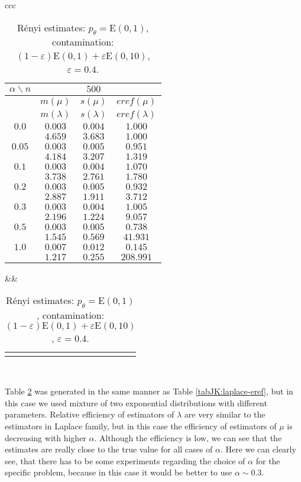 {\begin{table}[htb] \footnotesize
\begin{center}
\begin{tabular}{ccc}
	\begin{tabular}{|c|ccc|}
	\hline
	$\alpha\backslash n$ && $500$ & \\
	\hline
	& $m(\mu)$ & $s(\mu)$ & $eref(\mu)$ \\
	& $m(\lambda)$ & $s(\lambda)$ & $eref(\lambda)$ \\
	\hline
	$0.0$ & $ 0.003 $ & $ 0.004 $ & $ 1.000 $\\
	 & $ 4.659 $ & $ 3.683 $ & $ 1.000 $\\
	\hline
	$0.05$ & $ 0.003 $ & $ 0.005 $ & $ 0.951 $\\
	 & $ 4.184 $ & $ 3.207 $ & $ 1.319 $\\
	\hline
	$0.1$ & $ 0.003 $ & $ 0.004 $ & $ 1.070 $\\
	 & $ 3.738 $ & $ 2.761 $ & $ 1.780 $\\
	\hline
	$0.2$ & $ 0.003 $ & $ 0.005 $ & $ 0.932 $\\
	 & $ 2.887 $ & $ 1.911 $ & $ 3.712 $\\
	\hline
	$0.3$ & $ 0.003 $ & $ 0.004 $ & $ 1.005 $\\
	 & $ 2.196 $ & $ 1.224 $ & $ 9.057 $\\
	\hline
	$0.5$ & $ 0.003 $ & $ 0.005 $ & $ 0.738 $\\
	 & $ 1.545 $ & $ 0.569 $ & $ 41.931 $\\
	\hline
	$1.0$ & $ 0.007 $ & $ 0.012 $ & $ 0.145 $\\
	 & $ 1.217 $ & $ 0.255 $ & $ 208.991 $\\
	\hline
	\end{tabular}
&&
	\begin{tabular}{c}
		\epsfig{file=Exp-e04-eref.eps, height=2.5in}
	\end{tabular}
\\
\end{tabular}
\end{center}
\caption{R\'{e}nyi estimates: $p_\theta = \mathrm{E}(0,1)$, contamination: $(1-\varepsilon)\mathrm{E}(0,1) + \varepsilon \mathrm{E}(0,10)$, $\varepsilon =  0.4$.}
\label{tabJK:exponential-eref}
\end{table}

\noindent Table \ref{tabJK:exponential-eref} was generated in the same manner as Table \ref{tabJK:laplace-eref}, but in this case we used mixture of two exponential distributions with different parameters. Relative efficiency of estimators of $\lambda$ are very similar to the estimators in Laplace family, but in this case the efficiency of estimators of $\mu$ is decreasing with higher $\alpha$. Although the efficiency is low, we can see that the estimates are really close to the true value for all cases of $\alpha$. Here we can clearly see, that there has to be some experiments regarding the choice of $\alpha$ for the specific problem, because in this case it would be better to use $\alpha \sim 0.3$.

}
